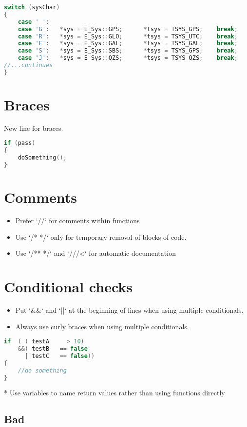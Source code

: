 \begin{lstlisting}[language=c++]
switch (sysChar)
{
    case ' ':
    case 'G':   *sys = E_Sys::GPS;      *tsys = TSYS_GPS;    break;
    case 'R':   *sys = E_Sys::GLO;      *tsys = TSYS_UTC;    break;
    case 'E':   *sys = E_Sys::GAL;      *tsys = TSYS_GAL;    break;
    case 'S':   *sys = E_Sys::SBS;      *tsys = TSYS_GPS;    break;
    case 'J':   *sys = E_Sys::QZS;      *tsys = TSYS_QZS;    break;
//...continues
}
\end{lstlisting}

\section{Braces}

New line for braces.
\begin{lstlisting}[language=c++]
if (pass)
{
    doSomething();
}
\end{lstlisting}

\section{Comments}

\begin{itemize}
\item Prefer `//` for comments within functions
\item Use `/* */` only for temporary removal of blocks of code.
\item Use `/** */` and `///<` for automatic documentation
\end{itemize}

\section{Conditional checks}
%
\begin{itemize}
\item  Put `\&\&` and `||` at the beginning of lines when using multiple conditionals.
\item  Always use curly braces when using multiple conditionals.
\end{itemize}
%
\begin{lstlisting}[language=c++]
if  ( ( testA     > 10)
    &&( testB   == false
      ||testC   == false))
{
    //do something
}
\end{lstlisting}

* Use variables to name return values rather than using functions directly

\subsection{Bad}

